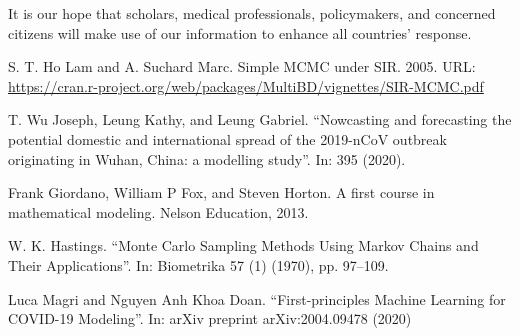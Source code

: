 \documentclass[a4paper]{article}
\begin{document}
It is our hope that scholars, medical professionals, policymakers, and concerned citizens will make use of our information to enhance all countries’ response. \\
\begin{thebibliography}{5}

 S. T. Ho Lam and A. Suchard Marc. Simple MCMC under SIR. 2005. URL: \href{https://cran.r-project.org/web/packages/MultiBD/vignettes/SIR-MCMC.pdf}{https://cran.r-project.org/web/packages/MultiBD/vignettes/SIR-MCMC.pdf} 

 T. Wu Joseph, Leung Kathy, and Leung Gabriel. “Nowcasting and forecasting the
potential domestic and international spread of the 2019-nCoV outbreak originating
in Wuhan, China: a modelling study”. In: 395 (2020).

 Frank Giordano, William P Fox, and Steven Horton. A first course in mathematical
modeling. Nelson Education, 2013.

 W. K. Hastings. “Monte Carlo Sampling Methods Using Markov Chains and Their
Applications”. In: Biometrika 57 (1) (1970), pp. 97–109.

 Luca Magri and Nguyen Anh Khoa Doan. “First-principles Machine Learning for
COVID-19 Modeling”. In: arXiv preprint arXiv:2004.09478 (2020)
\end{thebibliography}
\end{document}
